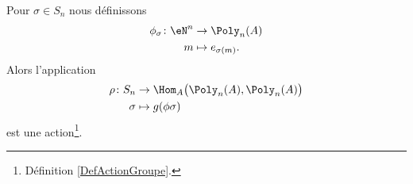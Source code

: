 \begin{lemma}       \label{LEMooIRVQooHvoNBq}
	Pour \( \sigma\in S_n\) nous définissons
	\begin{equation}
		\begin{aligned}
			\phi_{\sigma}\colon \eN^n & \to \Poly_n(A)         \\
			m                         & \mapsto e_{\sigma(m)}.
		\end{aligned}
	\end{equation}
	Alors l'application
	\begin{equation}
		\begin{aligned}
			\rho\colon S_n & \to \Hom_A\big( \Poly_n(A),\Poly_n(A) \big) \\
			\sigma         & \mapsto g(\phi{\sigma})
		\end{aligned}
	\end{equation}
	est une action\footnote{Définition \ref{DefActionGroupe}.}.
\end{lemma}


